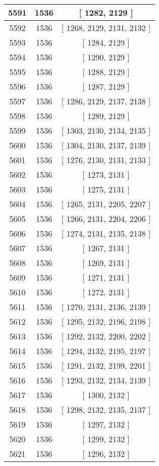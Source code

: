 \begin{center}
\begin{longtable}[H]{|| c c c ||}
\hline
5591 & 1536 & [ 1282, 2129 ] \\ 
\hline
5592 & 1536 & [ 1268, 2129, 2131, 2132 ] \\ 
\hline
5593 & 1536 & [ 1284, 2129 ] \\ 
\hline
5594 & 1536 & [ 1290, 2129 ] \\ 
\hline
5595 & 1536 & [ 1288, 2129 ] \\ 
\hline
5596 & 1536 & [ 1287, 2129 ] \\ 
\hline
5597 & 1536 & [ 1286, 2129, 2137, 2138 ] \\ 
\hline
5598 & 1536 & [ 1289, 2129 ] \\ 
\hline
5599 & 1536 & [ 1303, 2130, 2134, 2135 ] \\ 
\hline
5600 & 1536 & [ 1304, 2130, 2137, 2139 ] \\ 
\hline
5601 & 1536 & [ 1276, 2130, 2131, 2133 ] \\ 
\hline
5602 & 1536 & [ 1273, 2131 ] \\ 
\hline
5603 & 1536 & [ 1275, 2131 ] \\ 
\hline
5604 & 1536 & [ 1265, 2131, 2205, 2207 ] \\ 
\hline
5605 & 1536 & [ 1266, 2131, 2204, 2206 ] \\ 
\hline
5606 & 1536 & [ 1274, 2131, 2135, 2138 ] \\ 
\hline
5607 & 1536 & [ 1267, 2131 ] \\ 
\hline
5608 & 1536 & [ 1269, 2131 ] \\ 
\hline
5609 & 1536 & [ 1271, 2131 ] \\ 
\hline
5610 & 1536 & [ 1272, 2131 ] \\ 
\hline
5611 & 1536 & [ 1270, 2131, 2136, 2139 ] \\ 
\hline
5612 & 1536 & [ 1295, 2132, 2196, 2198 ] \\ 
\hline
5613 & 1536 & [ 1292, 2132, 2200, 2202 ] \\ 
\hline
5614 & 1536 & [ 1294, 2132, 2195, 2197 ] \\ 
\hline
5615 & 1536 & [ 1291, 2132, 2199, 2201 ] \\ 
\hline
5616 & 1536 & [ 1293, 2132, 2134, 2139 ] \\ 
\hline
5617 & 1536 & [ 1300, 2132 ] \\ 
\hline
5618 & 1536 & [ 1298, 2132, 2135, 2137 ] \\ 
\hline
5619 & 1536 & [ 1297, 2132 ] \\ 
\hline
5620 & 1536 & [ 1299, 2132 ] \\ 
\hline
5621 & 1536 & [ 1296, 2132 ] \\ 

\end{longtable}
\end{center}
